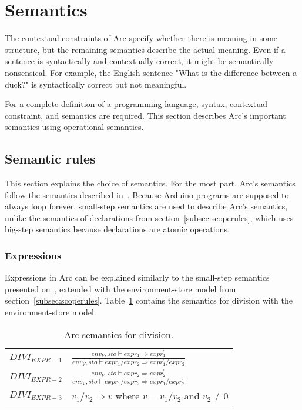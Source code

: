 \section{Semantics}\label{sec:languagesemantics}
The contextual constraints of Arc specify whether there is meaning in some structure, but the remaining semantics describe the actual meaning. Even if a sentence is syntactically and contextually correct, it might be semantically nonsensical. For example, the English sentence "What is the difference between a duck?" is syntactically correct but not meaningful.

For a complete definition of a programming language, syntax, contextual constraint, and semantics are required. This section describes Arc's important semantics using operational semantics.

\subsection{Semantic rules}\label{subsec:semanticrules}
This section explains the choice of semantics. For the most part, Arc's semantics follow the semantics described in~\cite{Huttel2010}. Because Arduino programs are supposed to always loop forever, small-step semantics are used to describe Arc's semantics, unlike the semantics of declarations from section~\ref{subsec:scoperules}, which uses big-step semantics because declarations are atomic operations.

\subsubsection{Expressions}
Expressions in Arc can be explained similarly to the small-step semantics presented on~\cite[p.~37]{Huttel2010}, extended with the environment-store model from section~\ref{subsec:scoperules}. Table~\ref{tab:divisionsemantics} contains the semantics for division with the environment-store model.


\begin{table}[htb!]
    \centering
    \begin{tabular}{ll}
        \toprule
        $DIVI_{EXPR-1}$ & $\frac{env_V, sto \vdash expr_1 \Rightarrow expr^\prime_1}{env_V, sto \vdash expr_1 / expr_2 \Rightarrow expr^\prime_1 / expr_2}$ \\ [12pt]
        $DIVI_{EXPR-2}$ & $\frac{env_V, sto \vdash expr_2 \Rightarrow expr^\prime_2}{env_V, sto \vdash expr_1 / expr_2 \Rightarrow expr_1 / expr^\prime_2}$ \\ [12pt]
        $DIVI_{EXPR-3}$ & $v_1 / v_2 \Rightarrow v$ where $v =v_1 / v_2$ and $v_2 \neq 0$                                                                   \\
        \bottomrule
    \end{tabular}
    \caption{Arc semantics for division.}
    \label{tab:divisionsemantics}
\end{table}


